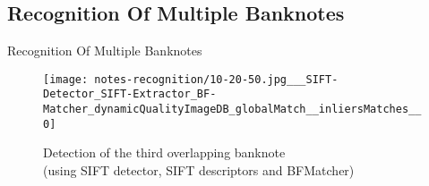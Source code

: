 \subsection*{Recognition Of Multiple Banknotes}
\begin{frame}{Recognition Of Multiple Banknotes}
	\begin{figure}[H]
		\centering
		\texttt{[image: notes-recognition/10-20-50.jpg\_\_\_SIFT-Detector\_SIFT-Extractor\_BF-Matcher\_dynamicQualityImageDB\_globalMatch\_\_inliersMatches\_\_0]}
		\caption{Detection of the third overlapping banknote\\(using SIFT detector, SIFT descriptors and BFMatcher)}
		\label{fig:recognition-overlapping-banknotes-3}
	\end{figure}
\end{frame}


